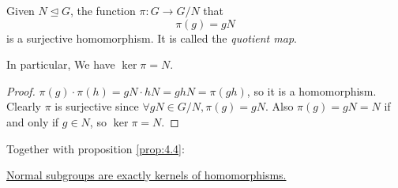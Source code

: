 \documentclass[10pt]{article}
\def\ltrigeq{\trianglelefteq}
\begin{document}
    \begin{theorem}\label{thm:map from group to quotients}
        Given $ N\ltrigeq G $, the function $ \pi:G\to G/N $ that 
        \[
            \pi(g)=gN
        \]
        is a surjective homomorphism. It is called the \textit{quotient map}. 
        
        In particular, We have $ \ker \pi=N $.
    \end{theorem}
    \begin{proof}
        $ \pi(g)\cdot \pi(h)=gN\cdot hN=ghN=\pi(gh) $, so it is a homomorphism. Clearly $ \pi $ is surjective since $ \forall gN\in G/N, \pi(g)=gN $. Also $ \pi(g)=gN=N $ if and only if $g\in N$, so $ \ker \pi=N $.
    \end{proof}
    Together with proposition \ref{prop:4.4}:
    
    \underline{Normal subgroups are exactly kernels of homomorphisms.}
\end{document}
